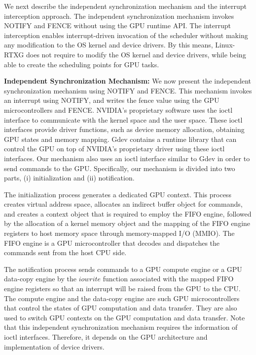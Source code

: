 We next describe the independent synchronization mechanism and the
interrupt interception approach.
The independent synchronization mechanism invokes NOTIFY and FENCE
without using the GPU runtime API.
The interrupt interception enables interrupt-driven invocation of the
scheduler without making any modification to the OS kernel and device
drivers.
By this means, Linux-RTXG does not require to modify the OS kernel and
device drivers, while being able to create the scheduling points for GPU
tasks. 

\textbf{Independent Synchronization Mechanism:}
We now present the independent synchronization mechanism using NOTIFY
and FENCE.
This mechanism invokes an interrupt using NOTIFY, and writes the fence
value using the GPU microcontrollers and FENCE.
NVIDIA's proprietary software uses the ioctl interface to communicate
with the kernel space and the user space. 
These ioctl interfaces provide driver functions, such as device memory
allocation, obtaining GPU states and memory mapping. 
Gdev contains a runtime library that can control the GPU on top of
NVIDIA's proprietary driver using these ioctl interfaces. 
Our mechanism also uses an ioctl interface similar to Gdev in order to
send commands to the GPU.
Specifically, our mechanism is divided into two parts, (i)
initialization and (ii) notification.

The initialization process generates a dedicated GPU context.
This process creates virtual address space, allocates an indirect buffer
object for commands, and creates a context object that is required to
employ the FIFO engine, followed by the allocation of a kernel memory
object and the mapping of the FIFO engine registers to host memory space
through memory-mapped I/O (MMIO). 
The FIFO engine is a GPU microcontroller that decodes and dispatches the
commands sent from the host CPU side.

The notification process sends commands to a GPU compute engine or a GPU
data-copy engine by the $iowrite$ function associated with the mapped
FIFO engine registers so that an interrupt will be raised from the GPU
to the CPU.
The compute engine and the data-copy engine are such GPU
microcontrollers that control the states of GPU computation and data
transfer.
They are also used to switch GPU contexts on the GPU computation and
data transfer.
Note that this independent synchronization mechanism requires the
information of ioctl interfaces.
Therefore, it depends on the GPU architecture and implementation of
device drivers.


